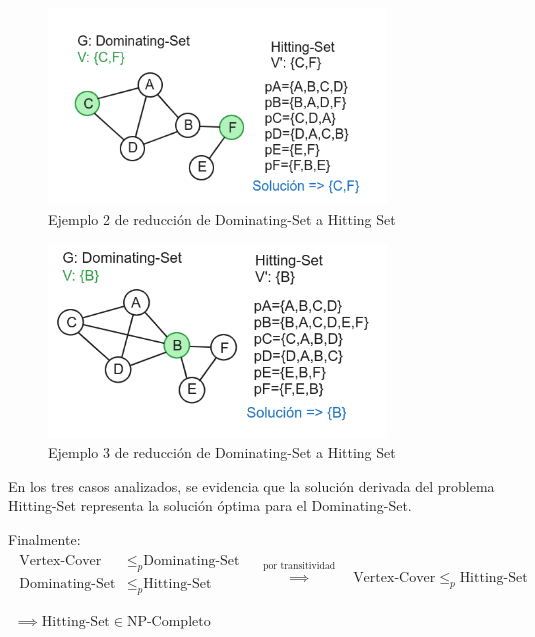\begin{figure}[H]
    \centering
    \includegraphics[width=0.8\textwidth]{img/ejemplo2_DS-HS.png}
    \caption{Ejemplo 2 de reducción de Dominating-Set a Hitting Set}
    \label{fig:ejemplo2_DS-HS}
\end{figure}


\begin{figure}[H]
    \centering
    \includegraphics[width=0.8\textwidth]{img/ejemplo3_DS-HS.png}
    \caption{Ejemplo 3 de reducción de Dominating-Set a Hitting Set}
    \label{fig:ejemplo3_DS-HS}
\end{figure}

En los tres casos analizados, se evidencia que la solución derivada del problema Hitting-Set representa la solución óptima para el Dominating-Set.


Finalmente:
\[
    \begin{array}{c}
        \begin{split}
            \text{Vertex-Cover}  & \leq _{p} \text{Dominating-Set} \\
            \text{Dominating-Set}  & \leq _{p} \text{Hitting-Set} \\
        \end{split}
        \quad \overset{ \text{por transitividad} }{ \implies  } \quad
        \text{Vertex-Cover}  \leq _{p} \text{Hitting-Set} \\ \\
        \implies \text{Hitting-Set} \in \text{NP-Completo}    
    \end{array}
\]



